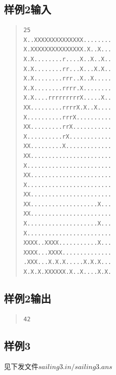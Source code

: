 \documentclass[12pt, a4paper]{article}
\begin{document}
\subsection{样例2输入}
\begin{quote}
\begin{verbatim}
25
X..XXXXXXXXXXXXXX........
X.XXXXXXXXXXXXXXX.X..X...
X.X........r....X..X..X..
X.X........rr...X...X.X..
X.X........rrr..X..X.....
X.X........rrrr.X........
X.X....rrrrrrrrrX.....X..
XX.........rrrrX.X..X....
X..........rrrX..........
XX.........rrX...........
X..........rX............
XX.........X.............
XX.......................
X........................
XX.......................
X........................
XX.......................
XX...................X...
XX.......................
X....................X...
X........................
XXXX..XXXX...........X...
XXXX...XXXX..............
.XXX...X.X.X.....X.X.X...
X.X.X.XXXXXX.X..X....X.X.
\end{verbatim}
\end{quote}
\subsection{样例2输出}
\begin{quote}
\begin{verbatim}
42
\end{verbatim}
\end{quote}
\subsection{样例3}
	
见下发文件$sailing3.in/sailing3.ans$
\end{document}
